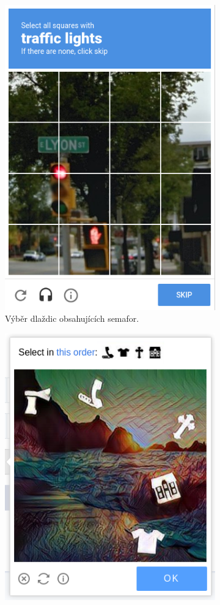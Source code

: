 \documentclass[
  field=ainfp,
  master=true,
  biblatex,
  sourcecodes=false,
  theorems=false,
  glossaries,
  index
]{kidiplom}
\begin{document}
\begin{figure}[H]
\centering
\begin{subfigure}{.5\textwidth}
  \centering
  \includegraphics[width=.8\linewidth]{images/squares.png}
  \caption{Výběr dlaždic obsahujících semafor.}
  \label{fig:recaptcha_selection}
\end{subfigure}%
\begin{subfigure}{.5\textwidth}
  \centering
  \includegraphics[width=.8\linewidth]{images/geetest_select.png}

\end{subfigure}
\end{figure}
\end{document}
